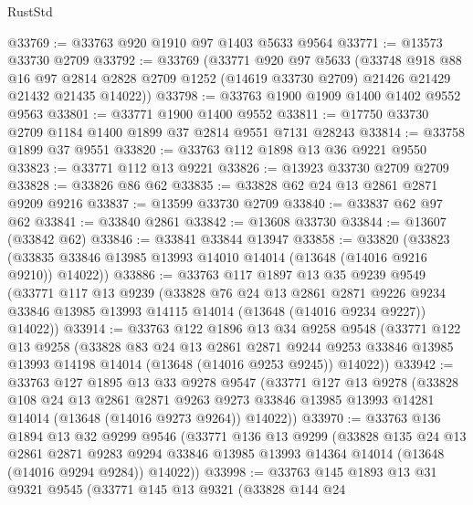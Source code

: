 \begin{lexlean}{RustStd}
\begin{coremodule}
@33769 := @33763 @920 @1910 @97 @1403 @5633 @9564
@33771 := @13573 @33730 @2709
@33792 := @33769
    (@33771
      @920
      @97
      @5633
      (@33748
        @918
        @88
        @16
        @97
        @2814
        @2828
        @2709
        @1252
        (@14619 @33730 @2709)
        @21426
        @21429
        @21432
        @21435
        @14022))
@33798 := @33763 @1900 @1909 @1400 @1402 @9552 @9563
@33801 := @33771 @1900 @1400 @9552
@33811 := @17750 @33730 @2709 @1184 @1400 @1899 @37 @2814 @9551 @7131 @28243
@33814 := @33758 @1899 @37 @9551
@33820 := @33763 @112 @1898 @13 @36 @9221 @9550
@33823 := @33771 @112 @13 @9221
@33826 := @13923 @33730 @2709 @2709
@33828 := @33826 @86 @62
@33835 := @33828 @62 @24 @13 @2861 @2871 @9209 @9216
@33837 := @13599 @33730 @2709
@33840 := @33837 @62 @97 @62
@33841 := @33840 @2861
@33842 := @13608 @33730
@33844 := @13607 (@33842 @62)
@33846 := @33841 @33844 @13947
@33858 := @33820
    (@33823 (@33835 @33846 @13985 @13993 @14010 @14014 (@13648 (@14016 @9216 @9210)) @14022))
@33886 := @33763
    @117
    @1897
    @13
    @35
    @9239
    @9549
    (@33771
      @117
      @13
      @9239
      (@33828
        @76
        @24
        @13
        @2861
        @2871
        @9226
        @9234
        @33846
        @13985
        @13993
        @14115
        @14014
        (@13648 (@14016 @9234 @9227))
        @14022))
@33914 := @33763
    @122
    @1896
    @13
    @34
    @9258
    @9548
    (@33771
      @122
      @13
      @9258
      (@33828
        @83
        @24
        @13
        @2861
        @2871
        @9244
        @9253
        @33846
        @13985
        @13993
        @14198
        @14014
        (@13648 (@14016 @9253 @9245))
        @14022))
@33942 := @33763
    @127
    @1895
    @13
    @33
    @9278
    @9547
    (@33771
      @127
      @13
      @9278
      (@33828
        @108
        @24
        @13
        @2861
        @2871
        @9263
        @9273
        @33846
        @13985
        @13993
        @14281
        @14014
        (@13648 (@14016 @9273 @9264))
        @14022))
@33970 := @33763
    @136
    @1894
    @13
    @32
    @9299
    @9546
    (@33771
      @136
      @13
      @9299
      (@33828
        @135
        @24
        @13
        @2861
        @2871
        @9283
        @9294
        @33846
        @13985
        @13993
        @14364
        @14014
        (@13648 (@14016 @9294 @9284))
        @14022))
@33998 := @33763
    @145
    @1893
    @13
    @31
    @9321
    @9545
    (@33771
      @145
      @13
      @9321
      (@33828
        @144
        @24

\end{coremodule}
\end{lexlean}
